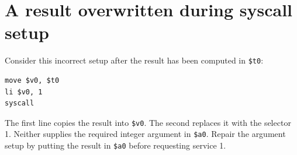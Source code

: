 \section{A result overwritten during syscall
  setup}\label{001-console-calculation-x-lost-result-a-result-overwritten-during-syscall-setup}

Consider this incorrect setup after the result has been computed in
\texttt{\$t0}:

\begin{verbatim}
move $v0, $t0
li $v0, 1
syscall
\end{verbatim}

The first line copies the result into \texttt{\$v0}. The second replaces
it with the selector 1. Neither supplies the required integer argument
in \texttt{\$a0}. Repair the argument setup by putting the result in
\texttt{\$a0} before requesting service 1.
